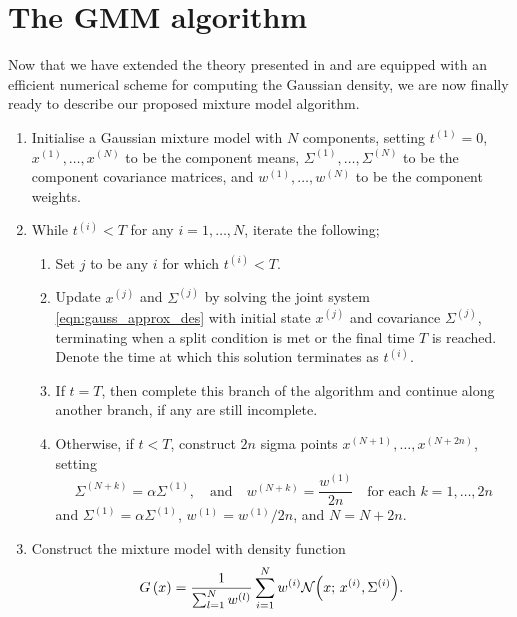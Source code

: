 \section{The GMM algorithm}\label{sec:gmm_alg}

Now that we have extended the theory presented in  and are equipped with an efficient numerical scheme for computing the Gaussian density, we are now finally ready to describe our proposed mixture model algorithm.



\begin{enumerate}
	\item Initialise a Gaussian mixture model with \(N\) components, setting \(t^{(1)} = 0\), \(x^{(1)},\dotsc, x^{(N)}\) to be the component means, \(\Sigma^{(1)}, \dotsc, \Sigma^{(N)}\) to be the component covariance matrices, and \(w^{(1)}, \dotsc, w^{(N)}\) to be the component weights.

	\item While \(t^{(i)} < T\) for any \(i = 1,\dotsc, N\), iterate the following;

		\begin{enumerate}
			\item Set \(j\) to be any \(i\) for which \(t^{(i)} < T\).

			\item Update \(x^{(j)}\) and \(\Sigma^{(j)}\) by solving the joint system \eqref{eqn:gauss_approx_des} with initial state \(x^{(j)}\) and covariance \(\Sigma^{(j)}\), terminating when a split condition is met or the final time \(T\) is reached.
		Denote the time at which this solution terminates as \(t^{(i)}\).

	\item If \(t = T\), then complete this branch of the algorithm and continue along another branch, if any are still incomplete.

	\item Otherwise, if \(t < T\), construct \(2n\) sigma points \(x^{(N + 1)},\dotsc,x^{(N + 2n)}\), setting
		\[
			\Sigma^{(N + k)} = \alpha \Sigma^{(1)}, \quad \text{and} \quad w^{(N + k)} = \frac{w^{(1)}}{2n} \quad \text{for each } k = 1,\dotsc,2n
		\]
		and \(\Sigma^{(1)} = \alpha \Sigma^{(1)}\), \(w^{(1)} = w^{(1)} / 2n\), and \(N = N + 2n\).
		\end{enumerate}

	\item Construct the mixture model with density function
		\[
			G\left(x\right) = \frac{1}{\sum_{l=1}^{N}w^{(l)}}\sum_{i=1}^{N}{w^{(i)}\mathcal{N}\!\left(x; \, x^{(i)}, \Sigma^{(i)}\right)}.
		\]

\end{enumerate}

